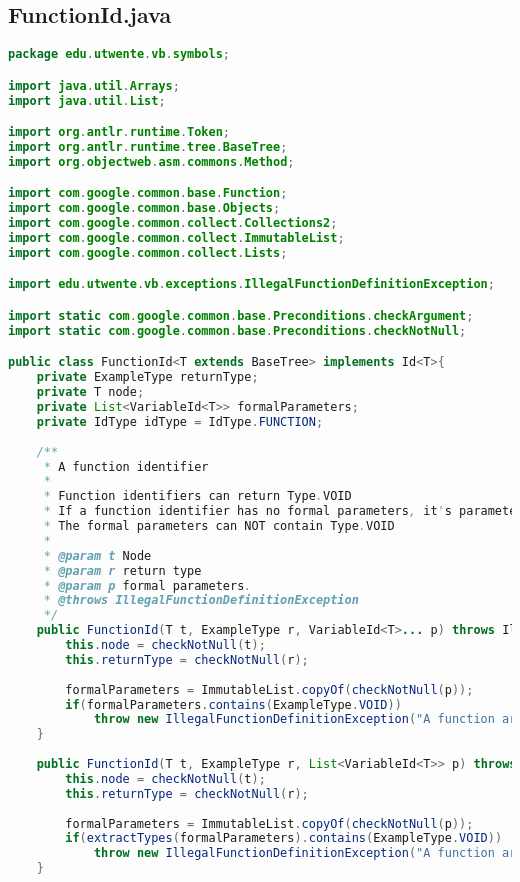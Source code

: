 \subsection{FunctionId.java}
\begin{lstlisting}[language=Java]
package edu.utwente.vb.symbols;

import java.util.Arrays;
import java.util.List;

import org.antlr.runtime.Token;
import org.antlr.runtime.tree.BaseTree;
import org.objectweb.asm.commons.Method;

import com.google.common.base.Function;
import com.google.common.base.Objects;
import com.google.common.collect.Collections2;
import com.google.common.collect.ImmutableList;
import com.google.common.collect.Lists;

import edu.utwente.vb.exceptions.IllegalFunctionDefinitionException;

import static com.google.common.base.Preconditions.checkArgument;
import static com.google.common.base.Preconditions.checkNotNull;

public class FunctionId<T extends BaseTree> implements Id<T>{
	private ExampleType returnType;
	private T node;
	private List<VariableId<T>> formalParameters;
	private IdType idType = IdType.FUNCTION;
	
	/**
	 * A function identifier
	 * 
	 * Function identifiers can return Type.VOID
	 * If a function identifier has no formal parameters, it's parameters will be the empty list
	 * The formal parameters can NOT contain Type.VOID
	 * 
	 * @param t Node
	 * @param r return type
	 * @param p formal parameters.
	 * @throws IllegalFunctionDefinitionException 
	 */
	public FunctionId(T t, ExampleType r, VariableId<T>... p) throws IllegalFunctionDefinitionException{
		this.node = checkNotNull(t);
		this.returnType = checkNotNull(r);
		
		formalParameters = ImmutableList.copyOf(checkNotNull(p));
		if(formalParameters.contains(ExampleType.VOID))
			throw new IllegalFunctionDefinitionException("A function argument can not have the VOID type");
	}
	
	public FunctionId(T t, ExampleType r, List<VariableId<T>> p) throws IllegalFunctionDefinitionException{
		this.node = checkNotNull(t);
		this.returnType = checkNotNull(r);
		
		formalParameters = ImmutableList.copyOf(checkNotNull(p));
		if(extractTypes(formalParameters).contains(ExampleType.VOID))
			throw new IllegalFunctionDefinitionException("A function argument can not have the VOID type");
	}
	

\end{lstlisting}
